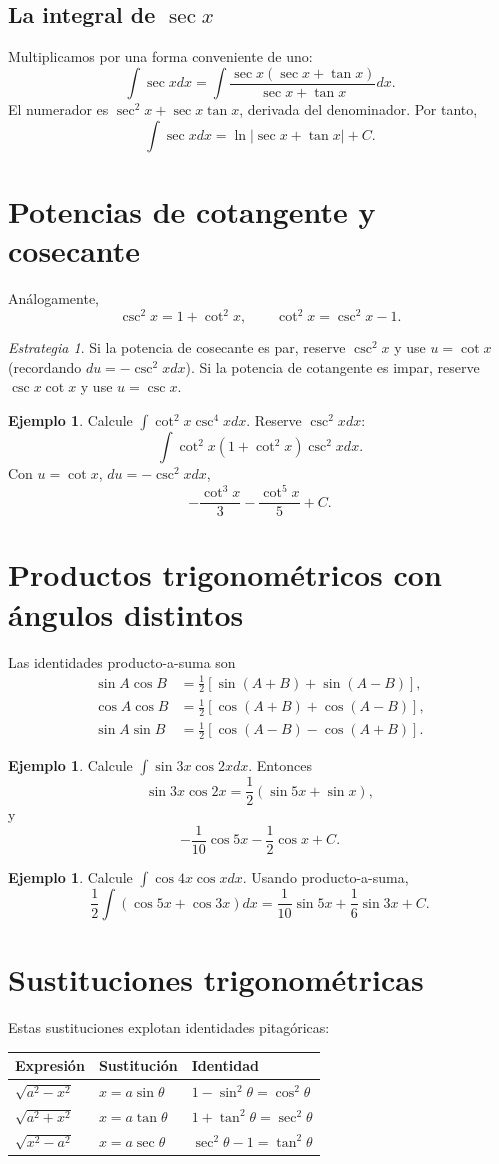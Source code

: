 \documentclass[12pt]{article}
\theoremstyle{definition}\newtheorem{definicion}[teorema]{Definición}\newtheorem{ejemplo}[teorema]{Ejemplo}\newtheorem{ejercicio}[teorema]{Ejercicio}
\theoremstyle{remark}\newtheorem*{observacion}{Observación}\newtheorem*{advertencia}{Advertencia}\newtheorem*{estrategia}{Estrategia}
\begin{document}
\subsection{La integral de $\sec x$}
Multiplicamos por una forma conveniente de uno:
\[\int\sec xdx=\int\frac{\sec x(\sec x+\tan x)}{\sec x+\tan x}dx.\]
El numerador es $\sec^2x+\sec x\tan x$, derivada del denominador. Por tanto,
\[\boxed{\int\sec xdx=\ln|\sec x+\tan x|+C}.\]

\section{Potencias de cotangente y cosecante}
Análogamente,
\[\csc^2x=1+\cot^2x,\qquad\cot^2x=\csc^2x-1.\]
\begin{estrategia}Si la potencia de cosecante es par, reserve $\csc^2x$ y use $u=\cot x$ (recordando $du=-\csc^2x dx$). Si la potencia de cotangente es impar, reserve $\csc x\cot x$ y use $u=\csc x$.\end{estrategia}
\begin{ejemplo}Calcule $\int\cot^2x\csc^4x dx$. Reserve $\csc^2x dx$:
\[\int\cot^2x(1+\cot^2x)\csc^2x dx.\]
Con $u=\cot x$, $du=-\csc^2x dx$,
\[\boxed{-\frac{\cot^3x}{3}-\frac{\cot^5x}{5}+C}.\]\end{ejemplo}

\section{Productos trigonométricos con ángulos distintos}
Las identidades producto-a-suma son
\begin{align*}
\sin A\cos B&=\tfrac12[\sin(A+B)+\sin(A-B)],\\
\cos A\cos B&=\tfrac12[\cos(A+B)+\cos(A-B)],\\
\sin A\sin B&=\tfrac12[\cos(A-B)-\cos(A+B)].
\end{align*}
\begin{ejemplo}Calcule $\int\sin3x\cos2x dx$. Entonces
\[\sin3x\cos2x=\frac12(\sin5x+\sin x),\]
y
\[\boxed{-\frac1{10}\cos5x-\frac12\cos x+C}.\]\end{ejemplo}
\begin{ejemplo}Calcule $\int\cos4x\cos xdx$. Usando producto-a-suma,
\[\frac12\int(\cos5x+\cos3x)dx=\boxed{\frac1{10}\sin5x+\frac16\sin3x+C}.\]\end{ejemplo}

\section{Sustituciones trigonométricas}
Estas sustituciones explotan identidades pitagóricas:
\begin{center}\begin{tabular}{lll}\toprule
Expresión & Sustitución & Identidad\\\midrule
$\sqrt{a^2-x^2}$ & $x=a\sin\theta$ & $1-\sin^2\theta=\cos^2\theta$\\
$\sqrt{a^2+x^2}$ & $x=a\tan\theta$ & $1+\tan^2\theta=\sec^2\theta$\\
$\sqrt{x^2-a^2}$ & $x=a\sec\theta$ & $\sec^2\theta-1=\tan^2\theta$\\\bottomrule
\end{tabular}\end{center}
\end{document}

